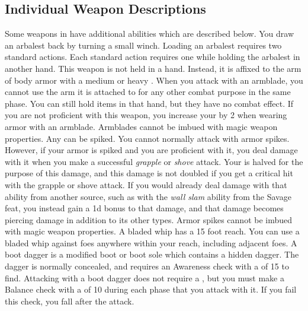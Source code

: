     \subsection{Individual Weapon Descriptions}
        Some weapons in  have additional abilities which are described below.
         You draw an arbalest back by turning a small winch. Loading an arbalest requires two standard actions.
        Each standard action requires one  while holding the arbalest in another hand.
         This weapon is not held in a hand.
        Instead, it is affixed to the arm of body armor with a medium or heavy .
        When you attack with an armblade, you cannot use the arm it is attached to for any other combat purpose in the same phase.
        You can still hold items in that hand, but they have no combat effect.
        If you are not proficient with this weapon, you increase your  by 2 when wearing armor with an armblade.
        Armblades cannot be imbued with magic weapon properties.
         Any  can be spiked.
        You cannot normally attack with armor spikes.
        However, if your armor is spiked and you are proficient with it, you deal damage with it when you make a successful \textit{grapple} or \textit{shove} attack.
        Your  is halved for the purpose of this damage, and this damage is not doubled if you get a critical hit with the grapple or shove attack.
        If you would already deal damage with that ability from another source, such as with the \textit{wall slam} ability from the Savage feat, you instead gain a \plus1d bonus to that damage, and that damage becomes piercing damage in addition to its other types.
        Armor spikes cannot be imbued with magic weapon properties.
         A bladed whip has a 15 foot reach.
        You can use a bladed whip against foes anywhere within your reach, including adjacent foes.
         A boot dagger is a modified boot or boot sole which contains a hidden dagger.
        The dagger is normally concealed, and requires an Awareness check with a  of 15 to find.
        Attacking with a boot dagger does not require a , but you must make a Balance check with a  of 10 during each phase that you attack with it.
        If you fail this check, you fall \prone after the attack.

